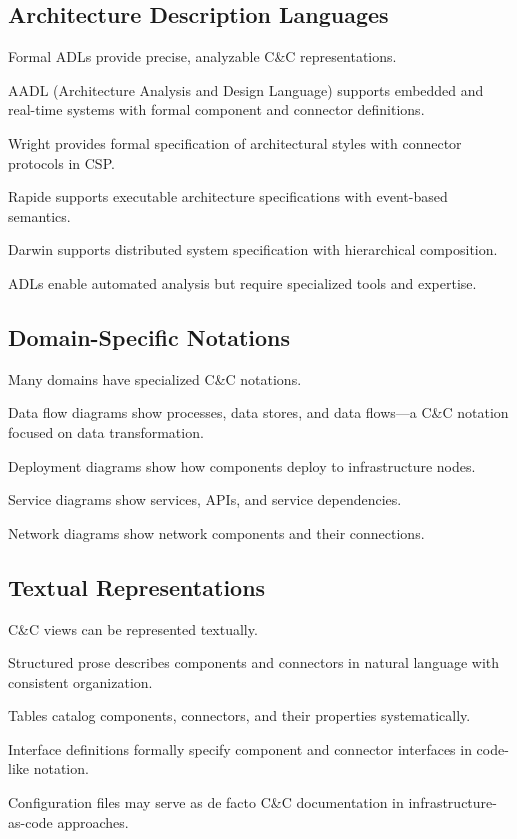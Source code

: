 \documentclass[11pt]{article}
\begin{document}
\subsection{Architecture Description Languages}

Formal ADLs provide precise, analyzable C\&C representations.

AADL (Architecture Analysis and Design Language) supports embedded and real-time systems with formal component and connector definitions.

Wright provides formal specification of architectural styles with connector protocols in CSP.

Rapide supports executable architecture specifications with event-based semantics.

Darwin supports distributed system specification with hierarchical composition.

ADLs enable automated analysis but require specialized tools and expertise.

\subsection{Domain-Specific Notations}

Many domains have specialized C\&C notations.

Data flow diagrams show processes, data stores, and data flows---a C\&C notation focused on data transformation.

Deployment diagrams show how components deploy to infrastructure nodes.

Service diagrams show services, APIs, and service dependencies.

Network diagrams show network components and their connections.

\subsection{Textual Representations}

C\&C views can be represented textually.

Structured prose describes components and connectors in natural language with consistent organization.

Tables catalog components, connectors, and their properties systematically.

Interface definitions formally specify component and connector interfaces in code-like notation.

Configuration files may serve as de facto C\&C documentation in infrastructure-as-code approaches.
\end{document}
